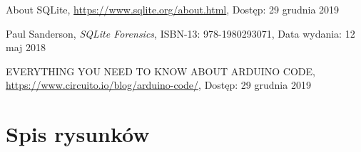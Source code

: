 \documentclass[a4paper,12pt, twoside]{article}
\begin{document}
\begin{thebibliography}{}
		About SQLite,
		\newline\url{https://www.sqlite.org/about.html}, 
		\newline Dostęp: 29 grudnia 2019
		
	    Paul Sanderson, \textit{SQLite Forensics}, ISBN-13: 978-1980293071,
		\newline Data wydania: 12 maj 2018
		
		EVERYTHING YOU NEED TO KNOW ABOUT ARDUINO CODE,
		\newline\url{https://www.circuito.io/blog/arduino-code/}, 
		\newline Dostęp: 29 grudnia 2019
		

		
	\end{thebibliography}
	\endgroup
	
	\newpage
	\section{Spis rysunków}
	\begingroup
	\renewcommand{\section}[2]{}%
	\listoffigures
	
	\endgroup
	
\end{document}
